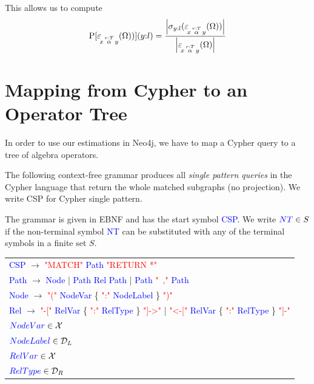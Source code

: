 This allows us to compute
\begin{align}
  \operatorname{P}[\varepsilon\!_{x\, \overset{r:T}{\alpha} \, y}(\Omega))](y{:}l)
    = \frac{{\left \vert \sigma_{y:l}(\varepsilon\!_{x\, \overset{r:T}{\alpha} \, y}(\Omega)) \right \vert}}
           {{\left \vert \varepsilon\!_{x\, \overset{r:T}{\alpha} \, y}(\Omega) \right \vert}}
\end{align}

\section{Mapping from Cypher to an Operator Tree}
\label{sec:cypher-to-operators}

In order to use our estimations in Neo4j, we have to map a Cypher query
to a tree of algebra operators.

\begin{definition}
\newcommand{\nt}[1]{\textcolor{blue}{#1}}
\newcommand{\te}[1]{\textcolor{red}{"#1"}}
The following context-free grammar produces all \emph{single pattern queries}
in the Cypher language that return the whole matched subgraphs (no projection).
We write CSP for Cypher single pattern.

The grammar is given in EBNF and has the start symbol \nt{CSP}.
We write
$\nt{NT} \in S$ if the non-terminal symbol \nt{NT} can be substituted
with any of the terminal symbols in a finite set $S$.

\begin{center}
\begin{tabular}{l}
  \nt{CSP} $\rightarrow$ \te{MATCH} \nt{Path} \te{RETURN *} \\
  \nt{Path} $\rightarrow$  \nt{Node} | \nt{Path} \nt{Rel} \nt{Path} |
                           \nt{Path} \te{\ ,} \nt{Path} \\
  \nt{Node} $\rightarrow$ \te{(} \nt{NodeVar} \{ \te{:} \nt{NodeLabel} \} \te{)} \\
  \nt{Rel} $\rightarrow$ \te{-[} \nt{RelVar} \{ \te{:} \nt{RelType} \} \te{]->} |
                         \te{<-[} \nt{RelVar} \{ \te{:} \nt{RelType} \} \te{]-} \\
  $\nt{NodeVar} \in \qvars$ \\
  $\nt{NodeLabel} \in \nlabels$ \\
  $\nt{RelVar} \in \qvars$ \\
  $\nt{RelType} \in \rtypes$
\end{tabular}
\end{center}
\end{definition}

